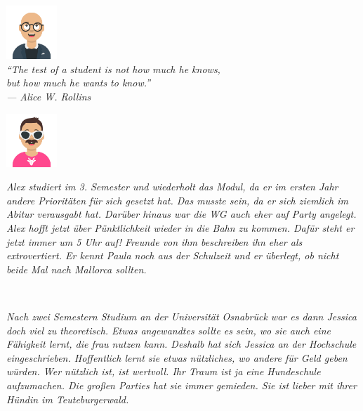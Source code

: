 \documentclass[a4paper, 9pt]{scrartcl}\usepackage[]{graphicx}\usepackage[]{xcolor}
\begin{document}
{\begin{center}
\includegraphics[width = 1.9cm]{avatare/Yuki}\\
\small
\vspace{1.5Ex}
\textit{"`The test of a student is not how much he knows,\\ but how much he wants to know."'\\ --- Alice W. Rollins}
\end{center}}
\maketitle
{}
\thispagestyle{empty}
\clearpage
\begin{minipage}[c]{0.125\textwidth}
\includegraphics[width = 1.9cm]{avatare/Alex}
\end{minipage}
\begin{minipage}[c]{0.875\textwidth}
\textit{Alex studiert im 3. Semester und wiederholt das Modul, da er im ersten Jahr andere Prioritäten für sich gesetzt hat. Das musste sein, da er sich ziemlich im Abitur verausgabt hat. Darüber hinaus war die WG auch eher auf Party angelegt. Alex hofft jetzt über Pünktlichkeit wieder in die Bahn zu kommen. Dafür steht er jetzt immer um 5 Uhr auf! Freunde von ihm beschreiben ihn eher als extrovertiert. Er kennt Paula noch aus der Schulzeit und er überlegt, ob nicht beide Mal nach Mallorca sollten.} 
\end{minipage}\\[2.75Ex]
\begin{minipage}[c]{0.875\textwidth}
\textit{Nach zwei Semestern Studium an der Universität Osnabrück war es dann Jessica doch viel zu theoretisch. Etwas angewandtes sollte es sein, wo sie auch eine Fähigkeit lernt, die frau nutzen kann. Deshalb hat sich Jessica an der Hochschule eingeschrieben. Hoffentlich lernt sie etwas nützliches, wo andere für Geld geben würden. Wer nützlich ist, ist wertvoll. Ihr Traum ist ja eine Hundeschule aufzumachen. Die großen Parties hat sie immer gemieden. Sie ist lieber mit ihrer Hündin im Teuteburgerwald.}
\end{minipage}
\end{document}
